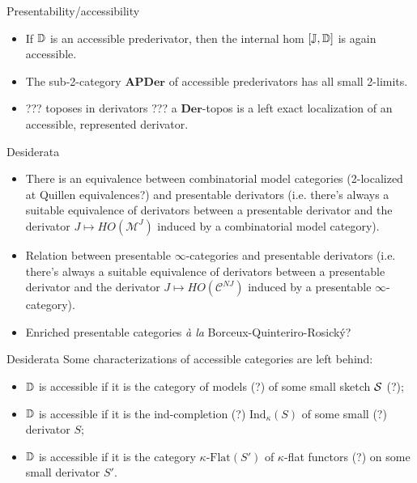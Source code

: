 \documentclass{beamer}
\begin{document}
%
%
%
%
\begin{frame}{Presentability/accessibility}
\begin{itemize}
    \item If $\mathbb{D}$ is an accessible prederivator, then the internal hom $[\mathbb{J},\mathbb{D}]$ is again accessible.
    \item The sub-2-category $\mathbf{APDer}$ of accessible prederivators has all small 2-limits.
    \item ??? toposes in derivators ??? a $\mathbf{Der}$-topos is a \alert{left exact} localization of an accessible, represented derivator.
\end{itemize}
\end{frame}
\begin{frame}{Desiderata}
\begin{itemize}
\item There is an equivalence between combinatorial model categories (2-localized at Quillen equivalences?) and presentable derivators (i.e. there's always a suitable equivalence of derivators between a presentable derivator and the derivator $J\mapsto HO(\mathcal{M}^J)$ induced by a combinatorial model category).
\item Relation between presentable $\infty$-categories and presentable derivators (i.e. there's always a suitable equivalence of derivators between a presentable derivator and the derivator $J\mapsto HO(\mathcal{C}^{NJ})$ induced by a presentable $\infty$-category).
\item Enriched presentable categories \emph{\`a la} Borceux-Quinteriro-Rosick\'y?
\end{itemize}
\end{frame}
%
%
%
%
\begin{frame}{Desiderata}
Some characterizations of accessible categories are left behind:
\begin{itemize}
    \item $\mathbb{D}$ is accessible if it is the category of models (?) of some small sketch \alert{$\cal S$} (?);
    \item $\mathbb{D}$ is accessible if it is the ind-completion (?) \alert{$\text{Ind}_\kappa(S)$} of some small (?) derivator $S$;
    \item $\mathbb{D}$ is accessible if it is the category \alert{$\kappa\text{-Flat}(S')$} of $\kappa$-flat functors (?) on some small derivator $S'$.
\end{itemize}
\end{frame}
    
    
    
    
    
%
%
%
\end{document}
